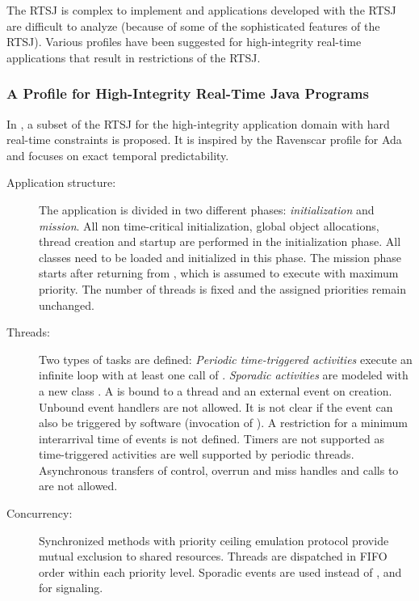 The RTSJ is complex to implement and applications developed with the
RTSJ are difficult to analyze (because of some of the sophisticated
features of the RTSJ). Various profiles have been suggested for
high-integrity real-time applications that result in restrictions of
the RTSJ.

\subsubsection{A Profile for High-Integrity Real-Time Java Programs}


In \cite{Pusch01}, a subset of the RTSJ for the high-integrity
application domain with hard real-time constraints is proposed. It
is inspired by the Ravenscar profile for Ada \cite{289525} and
focuses on exact temporal predictability.
%
\begin{description}
\item[Application structure:] The application is divided in two
different phases: \textit{initialization} and \textit{mission}. All
non time-critical initialization, global object allocations, thread
creation and startup are performed in the initialization phase. All
classes need to be loaded and initialized in this phase. The mission
phase starts after returning from , which is assumed to
execute with maximum priority. The number of threads is fixed and
the assigned priorities remain unchanged.

\item[Threads:] Two types of tasks are defined: \textit{Periodic
time-triggered activities} execute an infinite loop with at least
one call of . \textit{Sporadic activities}
are modeled with a new class . A
 is bound to a thread and an external event on
creation. Unbound event handlers are not allowed. It is not clear if
the event can also be triggered by software (invocation of
). A restriction for a minimum interarrival time of
events is not defined. Timers are not supported as time-triggered
activities are well supported by periodic threads. Asynchronous
transfers of control, overrun and miss handles and calls to
 are not allowed.

\item[Concurrency:] Synchronized methods with priority ceiling emulation protocol
provide mutual exclusion to shared resources. Threads are dispatched
in FIFO order within each priority level. Sporadic events are used
instead of ,  and  for
signaling.


\end{description}
